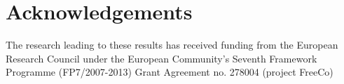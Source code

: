 \documentclass[11pt]{article}
\begin{document}
    

    \hypertarget{acknowledgements}{%
\section{Acknowledgements}\label{acknowledgements}}

The research leading to these results has received funding from the
European Research Council under the European Community's Seventh
Framework Programme (FP7/2007-2013) Grant Agreement no. 278004 (project
FreeCo)


    
    
    
    
\end{document}
